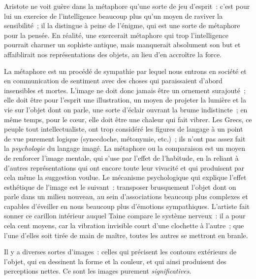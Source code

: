 \documentclass[french,twoside]{book} %
\begin{document}
\noindent Aristote ne voit guère dans la métaphore qu’une sorte de jeu d’esprit : c’est pour lui un exercice de l’intelligence beaucoup plus qu’un moyen de raviver la sensibilité ; il la distingue à peine de l’énigme, qui est une sorte de métaphore pour la pensée. En réalité, une exercerait métaphore qui trop l’intelligence pourrait charmer un sophiste antique, mais manquerait absolument son but et affaiblirait nos représentations des objets, au lieu d’en accroître la force.\par
La métaphore est un procédé de sympathie par lequel nous entrons en société et en communication de sentiment avec des choses qui paraissaient d’abord insensibles et mortes. L’image ne doit donc jamais être un ornement surajouté ; elle doit être pour l’esprit une illustration, un moyen de projeter la lumière et la vie sur l’objet dont on parle, une sorte d’éclair ouvrant la brume indistincte ; en même temps, pour le cœur, elle doit être une chaleur qui fait vibrer. Les Grecs, ce peuple tout intellectualiste, ont trop considéré les figures de langage à un point de vue purement logique (synecdoche, métonymie, etc.) ; ils n’ont pas assez fait la \emph{psychologie} du langage imagé. La métaphore ou la comparaison est un moyen de renforcer l’image mentale, qui s’use par l’effet de l’habitude, en la reliant à d’autres représentations qui ont encore toute leur vivacité et qui produisent par cela même la suggestion voulue. Le mécanisme psychologique qui explique l’effet esthétique de l’image est le suivant : transposer brusquement l’objet dont on parle dans un milieu nouveau, au sein d’associations beaucoup plus complexes et capables d’éveiller en nous beaucoup plus d’émotions sympathiques. L’artiste fait sonner ce carillon intérieur auquel Taine compare le système nerveux : il a pour cela cent moyens, car la vibration invisible court d’une clochette à l’autre ; que l’une d’elles soit tirée de main de maître, toutes les autres se mettront en branle.\par
Il y a diverses sortes d’images : celles qui précisent les contours extérieurs de l’objet, qui en dessinent la forme et la couleur, et qui ainsi produisent des perceptions nettes. Ce sont les images purement \emph{significatives}.\par
\end{document}
